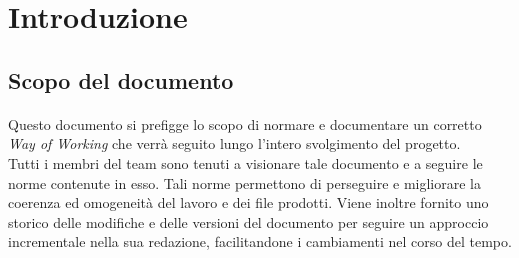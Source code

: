 \documentclass[10pt, a4paper]{article}
\title{\titolo}
\author{SWEetCode}
\begin{document}



\newpage

\tableofcontents
\newpage

\section{Introduzione}
\subsection{Scopo del documento}
\paragraph{}Questo documento si prefigge lo scopo di normare e documentare un corretto \textit{Way of Working} che verrà seguito lungo l'intero svolgimento del progetto.\\
	Tutti i membri del team sono tenuti a visionare tale documento e a seguire le norme contenute in esso. Tali norme permettono di perseguire e migliorare la coerenza ed omogeneità del lavoro e dei file prodotti.
	Viene inoltre fornito uno storico delle modifiche e delle versioni del documento per seguire un approccio incrementale nella sua redazione, facilitandone i cambiamenti nel corso del tempo.

\end{document}
